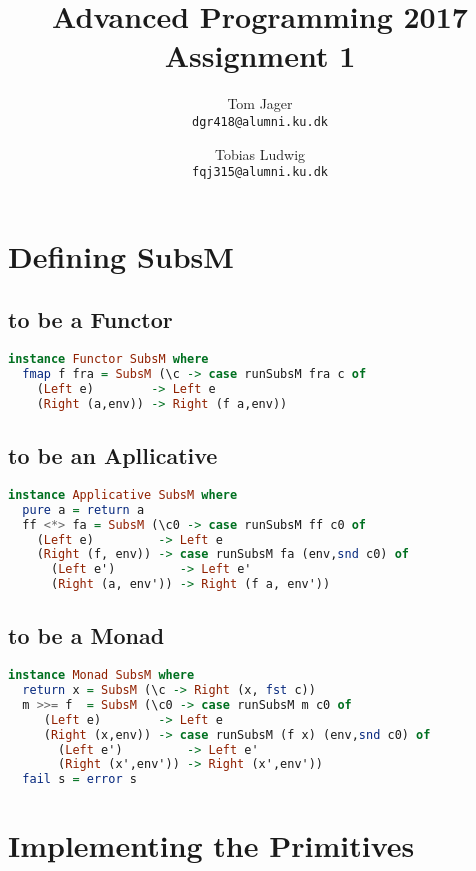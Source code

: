 \documentclass{article}
\title{Advanced Programming 2017\\Assignment 1}
\author{
Tom Jager\\
\texttt{dgr418@alumni.ku.dk}
\and
Tobias Ludwig\\
\texttt{fqj315@alumni.ku.dk}}
\begin{document}
\maketitle

\section{Defining SubsM \textellipsis}

\subsection{\textellipsis to be a Functor}

\begin{lstlisting}[language=Haskell]
instance Functor SubsM where
  fmap f fra = SubsM (\c -> case runSubsM fra c of
    (Left e)        -> Left e
    (Right (a,env)) -> Right (f a,env))
\end{lstlisting}



\subsection{\textellipsis to be an Apllicative}
\begin{lstlisting}[language=Haskell]
instance Applicative SubsM where
  pure a = return a
  ff <*> fa = SubsM (\c0 -> case runSubsM ff c0 of
    (Left e)         -> Left e
    (Right (f, env)) -> case runSubsM fa (env,snd c0) of
      (Left e')         -> Left e'
      (Right (a, env')) -> Right (f a, env'))
\end{lstlisting}


\subsection{\textellipsis to be a Monad}
\begin{lstlisting}[language=Haskell]
instance Monad SubsM where
  return x = SubsM (\c -> Right (x, fst c))
  m >>= f  = SubsM (\c0 -> case runSubsM m c0 of
     (Left e)        -> Left e
     (Right (x,env)) -> case runSubsM (f x) (env,snd c0) of
       (Left e')         -> Left e'
       (Right (x',env')) -> Right (x',env'))
  fail s = error s
\end{lstlisting}


\section{Implementing the Primitives}
\end{document}
